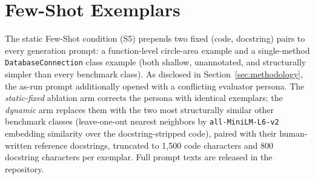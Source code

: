 \documentclass[pdflatex,sn-mathphys-ay]{sn-jnl}%
\theoremstyle{thmstyleone}%
\theoremstyle{thmstyletwo}%
\theoremstyle{thmstylethree}%
\begin{document}
\section{Few-Shot Exemplars}
\label{sec:appendix-fewshot}
The static Few-Shot condition (S5) prepends two fixed (code, docstring) pairs to every generation prompt: a function-level circle-area example and a single-method \texttt{DatabaseConnection} class example (both shallow, unannotated, and structurally simpler than every benchmark class). {\color{blue}
As disclosed in Section~\ref{sec:methodology}, the as-run prompt additionally opened with a conflicting evaluator persona. The \emph{static-fixed} ablation arm corrects the persona with identical exemplars; the \emph{dynamic} arm replaces them with the two most structurally similar other benchmark classes (leave-one-out nearest neighbors by \texttt{all-MiniLM-L6-v2} embedding similarity over the docstring-stripped code), paired with their human-written reference docstrings, truncated to 1{,}500 code characters and 800 docstring characters per exemplar. Full prompt texts are released in the repository.
}
\end{document}
